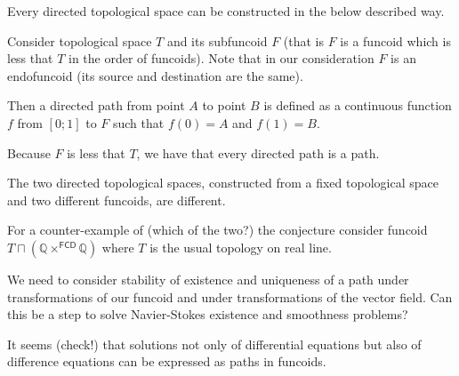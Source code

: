 \begin{conjecture}
Every directed topological space can be constructed in the below described way.
\end{conjecture}

Consider topological space $T$ and its subfuncoid $F$ (that is $F$ is a funcoid which is less that $T$ in the order of funcoids).
Note that in our consideration $F$ is an endofuncoid (its source and destination are the same).

Then a directed path from point $A$ to point $B$ is defined as a continuous function $f$ from $[0;1]$ to $F$ such that $f(0)=A$ and $f(1)=B$.

Because $F$ is less that $T$, we have that every directed path is a path.

\begin{conjecture}
The two directed topological spaces, constructed from a fixed topological space and two different funcoids,
are different.
\end{conjecture}

For a counter-example of (which of the two?) the conjecture consider funcoid $T\sqcap(\mathbb{Q}\times^{\mathsf{FCD}}\mathbb{Q})$
where $T$ is the usual topology on real line.

We need to consider stability of existence and uniqueness of a path under transformations of our funcoid and
under transformations of the vector field. Can this be a step to solve Navier-Stokes existence and smoothness problems?

It seems (check!) that solutions not only of differential equations but also of difference equations can be
expressed as paths in funcoids.